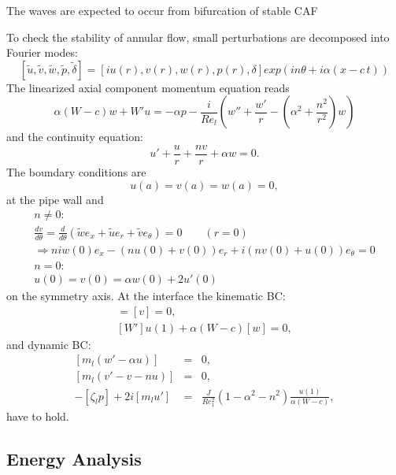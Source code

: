 The waves are expected to occur from bifurcation of stable CAF
\par
To check the stability of annular flow, small perturbations are decomposed into Fourier modes:
\begin{equation*}
 \left[ \tilde u, \tilde v, \tilde w, \tilde p, \tilde \delta \right] = \left[ i u(r), v(r), w(r), p(r), \delta \right] exp\left(in\theta+i\alpha (x - c \, t)\right)
\end{equation*}
The linearized axial component momentum equation reads
\begin{equation*}
 \alpha (W - c) w + W' u = -\alpha p - \frac{i}{Re_l} \left(w''+\frac{w'}{r}-(\alpha^2+\frac{n^2}{r^2})w \right)
\end{equation*}
and the continuity equation:
\begin{equation*}
 u'+\frac{u}{r}+\frac{nv}{r}+\alpha w=0.
\end{equation*}
The boundary conditions are
\begin{equation*}
 u(a)=v(a)=w(a)=0,
\end{equation*}
at the pipe wall and
\begin{eqnarray*}
 n\ne 0: \\
 \frac{d v}{d\theta} = \frac{d }{d\theta} (\tilde w e_x + \tilde u e_r + \tilde v e_{\theta}) =0 \quad \quad (r=0)\\
 \Rightarrow n i w(0) e_x - ( n u(0) + v(0) )e_r + i (n v(0) + u(0) ) e_{\theta}=0\\
  n=0: \\
 u(0)=v(0)=\alpha w(0) + 2 u'(0)
\end{eqnarray*}
on the symmetry axis. 
At the interface the kinematic BC:
\begin{eqnarray*}
 [u]=[v]=0, \\
 \left[W'\right] u(1) + \alpha (W-c)[w]=0,
\end{eqnarray*}
and dynamic BC:
\begin{eqnarray*}
 \left[ m_l(w'-\alpha u) \right] &=& 0, \\
 \left[ m_l(v'-v-nu) \right] &=& 0, \\
 -\left[ \zeta_l p \right]+2 i \left[m_l u'\right] &=& \frac{J}{Re_1^2} (1-\alpha^2-n^2) \frac{u(1)}{\alpha(W-c)},
\end{eqnarray*}
have to hold. \par

\subsection*{Energy Analysis}

